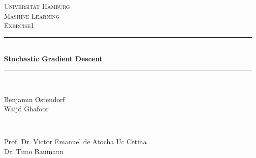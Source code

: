 \documentclass[11pt]{article}
\begin{document}

\begin{titlepage} %
	\newcommand{\HRule}{\rule{\linewidth}{0.5mm}} %
	
	\center %
	
	
	\textsc{\LARGE Universität Hamburg}\\[1.5cm] %
	
	\textsc{\Large Mashine Learning}\\[0.5cm] %
	
	\textsc{\large Exercise1}\\[0.5cm] %
	
	
	\HRule\\[0.4cm]
	
	{\huge\bfseries Stochastic Gradient Descent}\\[0.4cm] %
	
	\HRule\\[1.5cm]
	
	
	\begin{minipage}{0.4\textwidth}
		\begin{flushleft}
			\large
			Benjamin Ostendorf\\
			Waijd Ghafoor%
		\end{flushleft}
	\end{minipage}
	~
	\begin{minipage}{0.4\textwidth}
		\begin{flushright}
			\large
			Prof. Dr. Victor Emanuel de Atocha Uc Cetina\\
			Dr. Timo Baumann %
		\end{flushright}
	\end{minipage}
	

\end{titlepage}
\end{document}
